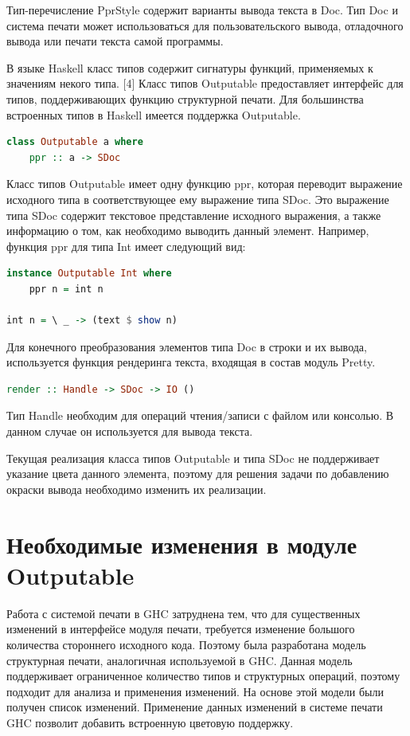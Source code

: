 Тип-перечисление PprStyle содержит варианты вывода текста в Doc. Тип Doc и система печати может использоваться для пользовательского вывода, отладочного вывода или печати текста самой программы.

В языке Haskell класс типов содержит сигнатуры функций, применяемых к значениям некого типа. [4] Класс типов Outputable предоставляет интерфейс для типов, поддерживающих функцию структурной печати. Для большинства встроенных типов в Haskell имеется поддержка Outputable.

\begin{lstlisting}[language=Haskell]
class Outputable a where
	ppr :: a -> SDoc
\end{lstlisting}

Класс типов Outputable имеет одну функцию ppr, которая переводит выражение исходного типа в соответствующее ему выражение типа SDoc. Это выражение типа SDoc содержит текстовое представление исходного выражения, а также информацию о том, как необходимо выводить данный элемент. Например, функция ppr для типа Int имеет следующий вид:

\begin{lstlisting}[language=Haskell]
instance Outputable Int where
    ppr n = int n

int n = \ _ -> (text $ show n)

\end{lstlisting}

Для конечного преобразования элементов типа Doc в строки и их вывода, используется функция рендеринга текста, входящая в состав модуль Pretty.

\begin{lstlisting}[language=Haskell, caption=Типовая аннотация к функции рендеринга текста]
render :: Handle -> SDoc -> IO ()
\end{lstlisting}

Тип Handle необходим для операций чтения/записи с файлом или консолью. В данном случае он используется для вывода текста.

Текущая реализация класса типов Outputable и типа SDoc не поддерживает указание цвета данного элемента, поэтому для решения задачи по добавлению окраски вывода необходимо изменить их реализации.

\section{Необходимые изменения в модуле Outputable}

Работа с системой печати в GHC затруднена тем, что для существенных изменений в интерфейсе модуля печати, требуется изменение большого количества стороннего исходного кода. Поэтому была разработана модель структурная печати, аналогичная используемой в GHC. Данная модель поддерживает ограниченное количество типов и структурных операций, поэтому подходит для анализа и применения изменений. На основе этой модели были получен список изменений. Применение данных изменений в системе печати GHC позволит добавить встроенную цветовую поддержку.

